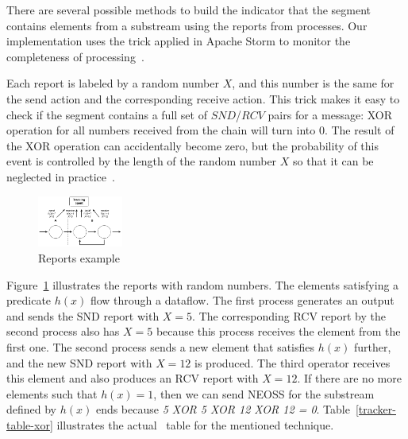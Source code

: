 
There are several possible methods to build the indicator that the segment contains elements from a substream using the reports from processes. Our implementation uses the trick applied in Apache Storm to monitor the completeness of processing~\cite{apache:storm:acker}. 

Each report is labeled by a random number $X$, and this number is the same for the send action and the corresponding receive action. This trick makes it easy to check if the segment contains a full set of $SND$/$RCV$ pairs for a message: XOR operation for all numbers received from the chain will turn into 0. The result of the XOR operation can accidentally become zero, but the probability of this event is controlled by the length of the random number $X$ so that it can be neglected in practice~\cite{apache:storm:acker}.

\begin{figure}[t]
  \centering
  \includegraphics[width=0.25\textwidth]{pics/tracker-segments-example.pdf}
  \caption{Reports example}
  \label{fig:tracker-reports}
\end{figure}

Figure~\ref{fig:tracker-reports} illustrates the reports with random numbers. The elements satisfying a predicate $h(x)$ flow through a dataflow. The first process generates an output and sends the SND report with $X=5$. The corresponding RCV report by the second process also has $X=5$ because this process receives the element from the first one. The second process sends a new element that satisfies $h(x)$ further, and the new SND report with $X=12$ is produced. The third operator receives this element and also produces an RCV report with $X=12$. If there are no more elements such that $h(x)=1$, then we can send NEOSS for the substream defined by $h(x)$ ends because {\em 5 XOR 5 XOR 12 XOR 12 = 0}. Table~\ref{tracker-table-xor} illustrates the actual \tracker\ table for the mentioned technique.


